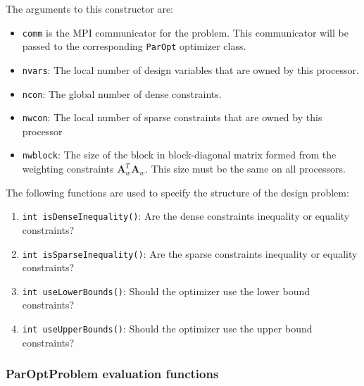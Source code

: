 \documentclass[12pt]{article}
\newcommand{\mb}{\mathbf}
\begin{document}
The arguments to this constructor are:
\begin{itemize}
\item \texttt{comm} is the MPI communicator for the problem. 
This communicator will be passed to the corresponding \texttt{ParOpt} optimizer class.

\item \texttt{nvars}: The local number of design variables that are owned by this processor.

\item \texttt{ncon}: The global number of dense constraints.

\item \texttt{nwcon}: The local number of sparse constraints that are owned by this processor

\item \texttt{nwblock}: The size of the block in block-diagonal matrix formed from the weighting constraints $\mb{A}_{w}^{T}\mb{A}_{w}$. This size must be the same on all processors.
\end{itemize}

The following functions are used to specify the structure of the design problem:
\begin{enumerate}
\item \texttt{int isDenseInequality()}: Are the dense constraints inequality or equality constraints?
\item \texttt{int isSparseInequality()}: Are the sparse constraints inequality or equality constraints?
\item \texttt{int useLowerBounds()}: Should the optimizer use the lower bound constraints?
\item \texttt{int useUpperBounds()}: Should the optimizer use the upper bound constraints?
\end{enumerate}

\subsubsection{ParOptProblem evaluation functions}
\end{document}
